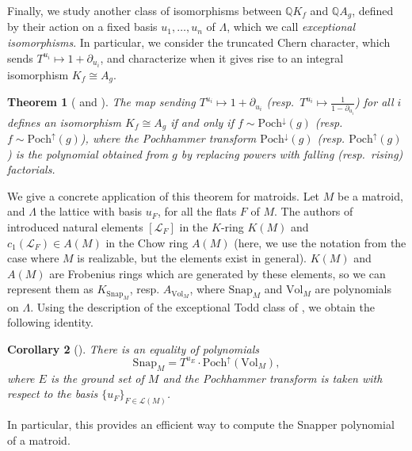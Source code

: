 \documentclass[oneside]{amsart}
\theoremstyle{plain}
\newtheorem{theorem}{Theorem}[section]
\newtheorem{corollary}[theorem]{Corollary}
\theoremstyle{definition}
\newcommand{\Q}{{\mathbb{Q}}}
\newcommand{\cL}{{\mathcal{L}}}
\newcommand{\Vol}{{\mathrm{Vol}}}
\newcommand{\Snap}{{\mathrm{Snap}}}
\newcommand{\Poch}{{\mathrm{Poch}}}
\begin{document}
Finally, we study another class of isomorphisms between $\Q K_f$ and $\Q A_g$,
defined by their action on a fixed basis $u_1, \dots, u_n$ of $\Lambda$, which we call \emph{exceptional isomorphisms}.
In particular, we consider the truncated Chern character, which sends $T^{u_i} \mapsto 1 + \partial_{u_i}$, and characterize when it gives rise to an integral isomorphism $K_f \cong A_g$.
\begin{theorem}[{ and }]
    The map sending $T^{u_i} \mapsto 1 + \partial_{u_i}$ (resp.\ $T^{u_i}\mapsto \frac{1}{1-\partial_{u_i}}$) for all $i$ defines an isomorphism $K_f \cong A_g$ if and only if
    $f \sim \Poch^\downarrow(g)$ (resp.\ $f \sim \Poch^\uparrow(g)$), where the Pochhammer transform $\Poch^\downarrow(g)$ (resp. $\Poch^\uparrow(g)$) is the polynomial obtained from $g$ by replacing powers with falling (resp.\ rising) factorials. 
\end{theorem}
We give a concrete application of this theorem for matroids. 
Let $M$ be a matroid, and $\Lambda$ the lattice with basis $u_F$, for all the flats $F$ of $M$.
The authors of \cite{LLPP24} introduced natural elements $[\cL_F]$ in the $K$-ring $K(M)$ and $c_1(\cL_F)\in A(M)$ in the Chow ring $A(M)$ (here, we use the notation from the case where $M$ is realizable, but the elements exist in general). $K(M)$ and $A(M)$ are Frobenius rings which are generated by these elements, so we can represent them as $K_{\Snap_M}$, resp. $A_{\Vol_M}$, where $\Snap_M$ and $\Vol_M$ are polynomials on $\Lambda$. Using the description of the exceptional Todd class of \cite{LLPP24}, we obtain the following identity.

\begin{corollary}[]
There is an equality of polynomials
\[
    \Snap_M = T^{u_E} \cdot \Poch^\uparrow(\Vol_M),
\]    
where $E$ is the ground set of $M$ and the Pochhammer transform is taken with respect to the basis $\{u_F\}_{F \in \cL(M)}$.
\end{corollary}
In particular, this provides an efficient way to compute the Snapper polynomial of a matroid.

\medskip
\end{document}
